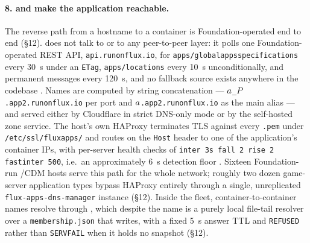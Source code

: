 \paragraph{8. \FDM and \PDNS make the application reachable.}
The reverse path from a hostname to a container is Foundation-operated end to end (\S12). \FDM does
not talk to \fluxd or to any peer-to-peer layer: it polls one Foundation-operated REST API,
\texttt{api.\allowbreak{}runonflux.\allowbreak{}io}, for \texttt{apps/\allowbreak{}globalappsspecifications} every \SI{30}{\second} under an
\texttt{ETag}, \texttt{apps/locations} every \SI{10}{\second} unconditionally, and permanent messages
every \SI{120}{\second}, and no fallback source exists anywhere in the codebase
. Names are computed by string
concatenation --- \texttt{$a$\_$P$.app2.runonflux.io} per port and \texttt{$a$.app2.runonflux.io}
as the main alias --- and served either by Cloudflare in strict DNS-only mode or by the self-hosted
\PDNS zone service. The \FDM host's own HAProxy terminates TLS against every \texttt{.pem} under
\texttt{/\allowbreak{}etc/\allowbreak{}ssl/\allowbreak{}fluxapps/\allowbreak{}} and routes on the \texttt{Host} header to one of the application's
container IPs, with per-server health checks of \texttt{inter 3s fall 2 rise 2 fastinter 500},
i.e.\ an approximately \SI{6}{\second} detection floor
. Sixteen Foundation-run
\FDM/CDM hosts serve this path for the whole network; roughly two dozen game-server application types
bypass HAProxy entirely through a single, unreplicated \texttt{flux-\allowbreak{}apps-\allowbreak{}dns-\allowbreak{}manager} instance
(\S12). Inside the fleet, container-to-container names resolve through \fluxdnsd, which despite the
name is a purely local file-tail resolver over a \texttt{membership.\allowbreak{}json} that \FluxOS writes, with a
fixed \SI{5}{\second} answer TTL and \texttt{REFUSED} rather than \texttt{SERVFAIL} when it holds no
snapshot (\S12).

